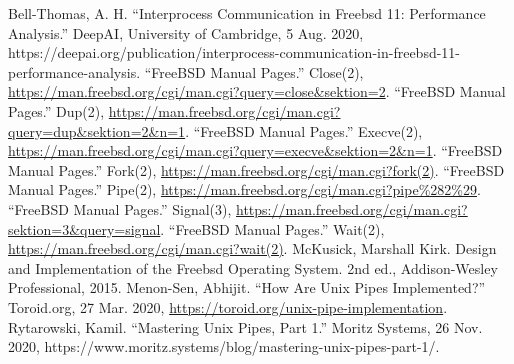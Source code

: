 \documentclass[12pt, dvipsnames, a4paper]{article}
\begin{document}
\begin{thebibliography}{00}
	 Bell-Thomas, A. H. “Interprocess Communication in Freebsd 11: Performance Analysis.” DeepAI, University of Cambridge, 5 Aug. 2020, https://deepai.org/publication/interprocess-communication-in-freebsd-11-performance-analysis.
	 “FreeBSD Manual Pages.” Close(2), \href{https://man.freebsd.org/cgi/man.cgi?query=close\&sektion=2}{https://man.freebsd.org/cgi/man.cgi?query=close\&sektion=2}.
	 “FreeBSD Manual Pages.” Dup(2), \href{https://man.freebsd.org/cgi/man.cgi?query=dup\&sektion=2\&n=1}{https://man.freebsd.org/cgi/man.cgi?query=dup\&sektion=2\&n=1}.
	 “FreeBSD Manual Pages.” Execve(2), \href{https://man.freebsd.org/cgi/man.cgi?query=execve\&sektion=2\&n=1}{https://man.freebsd.org/cgi/man.cgi?query=execve\&sektion=2\&n=1}.
	 “FreeBSD Manual Pages.” Fork(2), \href{https://man.freebsd.org/cgi/man.cgi?fork(2)}{https://man.freebsd.org/cgi/man.cgi?fork(2)}.	
	 “FreeBSD Manual Pages.” Pipe(2), \href{https://man.freebsd.org/cgi/man.cgi?pipe\%282\%29}{https://man.freebsd.org/cgi/man.cgi?pipe\%282\%29}.
	 “FreeBSD Manual Pages.” Signal(3), \href{https://man.freebsd.org/cgi/man.cgi?sektion=3\&query=signal}{https://man.freebsd.org/cgi/man.cgi?sektion=3\&query=signal}.
	 “FreeBSD Manual Pages.” Wait(2), \href{https://man.freebsd.org/cgi/man.cgi?wait(2)}{https://man.freebsd.org/cgi/man.cgi?wait(2)}.
	 McKusick, Marshall Kirk. Design and Implementation of the Freebsd Operating System. 2nd ed., Addison-Wesley Professional, 2015.
	 Menon-Sen, Abhijit. “How Are Unix Pipes Implemented?” Toroid.org, 27 Mar. 2020, \href{https://toroid.org/unix-pipe-implementation}{https://toroid.org/unix-pipe-implementation}.
	Rytarowski, Kamil. “Mastering Unix Pipes, Part 1.” Moritz Systems, 26 Nov. 2020, https://www.moritz.systems/blog/mastering-unix-pipes-part-1/.
\end{thebibliography}
\end{document}
